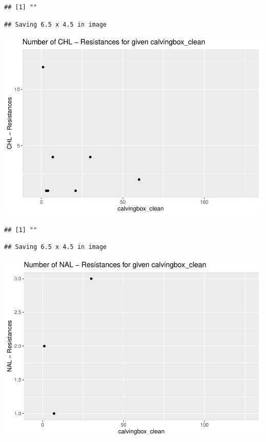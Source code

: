 \documentclass[
]{article}
\begin{document}
\begin{verbatim}
## [1] ""
\end{verbatim}

\begin{verbatim}
## Saving 6.5 x 4.5 in image
\end{verbatim}

\includegraphics{NResistenzen_files/figure-latex/numerical_variables-26.pdf}

\begin{verbatim}
## [1] ""
\end{verbatim}

\begin{verbatim}
## Saving 6.5 x 4.5 in image
\end{verbatim}

\includegraphics{NResistenzen_files/figure-latex/numerical_variables-27.pdf}
\end{document}
